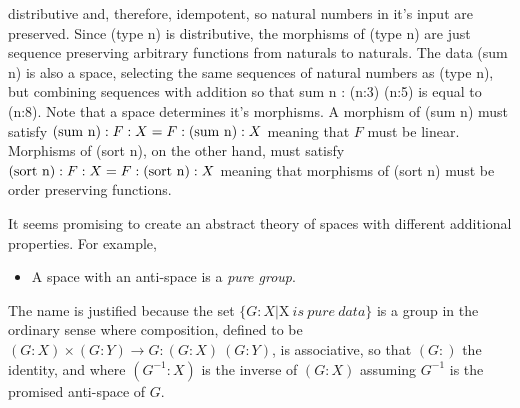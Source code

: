 \documentclass[11pt]{article}
\begin{document}
distributive and, therefore, idempotent, so natural numbers in it's input are preserved.
Since (type n) is distributive, the morphisms of (type n) are just sequence preserving arbitrary functions from naturals to naturals.
The data (sum n) is also a space, selecting the same sequences of  natural numbers as (type n), but combining
sequences with addition so that sum n : (n:3) (n:5) is equal to (n:8).  Note that a space determines it's morphisms.
A morphism of (sum n) must satisfy $({\rm sum\ n}):F:X = F:({\rm sum\ n}):X$ meaning that $F$ must be linear.
Morphisms of (sort n), on the other hand, must satisfy $({\rm sort\ n}):F:X=F:({\rm sort\ n}):X$ meaning that
morphisms of (sort n) must be order preserving functions.

     It seems promising to create an abstract theory of spaces with different additional properties.  For
 example,
\begin{itemize}
\item A space with an anti-space is a {\it pure group}.
\end{itemize}
The name is justified because the set $\{G:X | $X$\ is\ pure\ data\}$
is a group in the ordinary sense where composition, defined to be $(G:X)\times(G:Y)\rightarrow G:(G:X)\ (G:Y)$, is associative, so that
$(G:)$ the identity, and where $(G^{-1}:X)$ is the inverse of $(G:X)$ assuming $G^{-1}$ is the promised anti-space of $G$.
\end{document}
